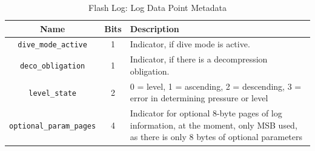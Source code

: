 \begin{table}[htbp]
  \centering
  \label{tab:log-meta}
  \begin{tabularx}{\textwidth}{|c|c|X|}
    \hline
    Name & Bits & Description \\
    \hline
    \lstinline{dive_mode_active} & 1 & Indicator, if dive mode is active. \\
    \hline
    \lstinline{deco_obligation} & 1 & Indicator, if there is a decompression obligation. \\
    \hline
    \lstinline{level_state} & 2 & 0 = level, 1 = ascending, 2 = descending, 3 = error in determining pressure or level \\
    \hline
    \lstinline{optional_param_pages} & 4 & Indicator for optional 8-byte pages of log information, at the moment, only MSB used, as there is only 8 bytes of optional parameters \\
    \hline
  \end{tabularx}
  \caption{Flash Log: Log Data Point Metadata}
\end{table}


